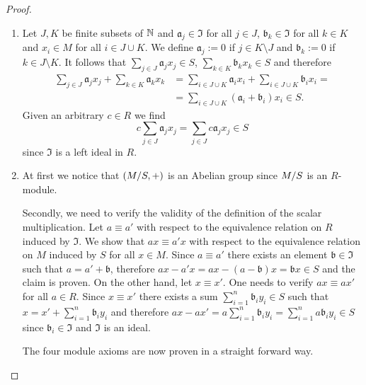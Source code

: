 \begin{proof}
\begin{enumerate}
\item Let $J,K$ be finite subsets of $\N$ and $\mathfrak{a}_j\in \mathfrak{I}$ for all $j\in J$, $\mathfrak{b}_k\in \mathfrak{I}$ for all $k\in K$ and  $x_i\in M$ for all $i\in J\cup K$. We define $\mathfrak{a}_j:=0$ if $j\in K \setminus J$ and $\mathfrak{b}_k:=0$ if $k\in J\setminus K$. It follows that $\sum_{j\in J}\mathfrak{a}_jx_j\in S$, $\sum_{k\in K}\mathfrak{b}_kx_k\in S$ and therefore
\begin{align*}
\sum_{j\in J}\mathfrak{a}_jx_j+\sum_{k\in K}\mathfrak{a}_kx_k &= \sum_{i\in J\cup K} \mathfrak{a}_ix_i+\sum_{i\in J\cup K} \mathfrak{b}_ix_i=\\
    &=\sum_{i\in J\cup K} (\mathfrak{a}_i+\mathfrak{b}_i)x_i\in S.
\end{align*} 
Given an arbitrary $c\in R$ we find
 \[c\sum_{j\in J}\mathfrak{a}_jx_j=\sum_{j\in J}c\mathfrak{a}_jx_j\in S\]
since $\mathfrak{I}$ is a left ideal in $R$.
\item At first we notice that $(\nicefrac{M}{S}, +)$ is an Abelian group since $\nicefrac{M}{S}$ is an $R$-module.

Secondly, we need to verify the validity of the definition of the scalar multiplication. Let $a\equiv a'$ with respect to the equivalence relation on $R$ induced by $\mathfrak{I}$. We show that $ax\equiv a'x$ with respect to the equivalence relation on $M$ induced by $S$ for all $x\in M$. Since $a\equiv a'$ there exists an element $\mathfrak{b}\in\mathfrak{I}$ such that $a=a'+\mathfrak{b}$, therefore $ax-a'x=ax-(a-\mathfrak{b})x=\mathfrak{b}x\in S$ and the claim is proven. On the other hand, let $x\equiv x'$. One needs to verify $ax\equiv ax'$ for all $a\in R$. Since $x\equiv x'$ there exists a sum $\sum_{i=1}^n\mathfrak{b}_iy_i\in S$ such that $x=x'+\sum_{i=1}^n\mathfrak{b}_iy_i$ and therefore $ax-ax'=a\sum_{i=1}^n\mathfrak{b}_iy_i=\sum_{i=1}^na\mathfrak{b}_iy_i\in S$ since $\mathfrak{b}_i\in\mathfrak{I}$ and $\mathfrak{I}$ is an ideal.

The four module axioms are now proven in a straight forward way.
\end{enumerate}
\end{proof}

